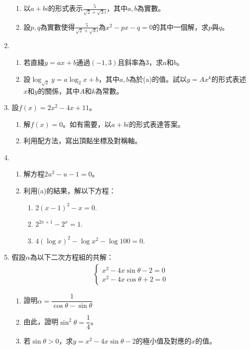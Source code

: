 \documentclass[12pt]{article}
\begin{document}
\begin{enumerate}
\begin{enumerate}
            \item 以$a+bi$的形式表示$\frac{5}{\sqrt{2}+\sqrt{3}i}$，其中$a,b$為實數。
            \item 設$p,q$為實數使得$\frac{5}{\sqrt{2}+\sqrt{3}i}$為$x^2-px-q=0$的其中一個解，求$p$與$q$。
        \end{enumerate}
        \item \begin{enumerate}
            \item 若直綫$y=ax+b$通過$(-1,3)$且斜率為$3$，求$a$和$b$。
            \item 設$\log_{\sqrt{2}}y=a\log_2{x}+b$，其中$a,b$為於(a)的值。試以$y=Ax^k$的形式表述$x$和$y$的關係，其中$A$和$k$為常數。
        \end{enumerate}
        \item 設$f(x)=2x^2-4x+11$。\begin{enumerate}
            \item 解$f(x)=0$。如有需要，以$a+bi$的形式表達答案。
            \item 利用配方法，寫出頂點坐標及對稱軸。
        \end{enumerate}
        \item \begin{enumerate}
            \item 解方程$2u^2-u-1=0$。
            \item 利用(a)的結果，解以下方程：\begin{enumerate}
                \item $2(x-1)^2-x=0$.
                \item $2^{2x+1}-2^x=1$.
                \item $4(\log{x})^2-\log{x^2}-\log{100}=0$.
            \end{enumerate}
        \end{enumerate}
        \item 假設$\alpha$為以下二次方程組的共解：\begin{align*}
            \begin{cases}
                x^2-4x\sin{\theta}-2=0\\
                x^2-4x\cos{\theta}+2=0
            \end{cases}
        \end{align*}\begin{enumerate}
            \item 證明$\alpha=\dfrac{1}{\cos{\theta}-\sin{\theta}}$
            \item 由此，證明$\sin^2{\theta}=\dfrac{1}{4}$。
            \item 若$\sin{\theta}>0$，求$y=x^2-4x\sin{\theta}-2$的極小值及對應的$x$的值。
        \end{enumerate}
    \end{enumerate}
\end{document}
